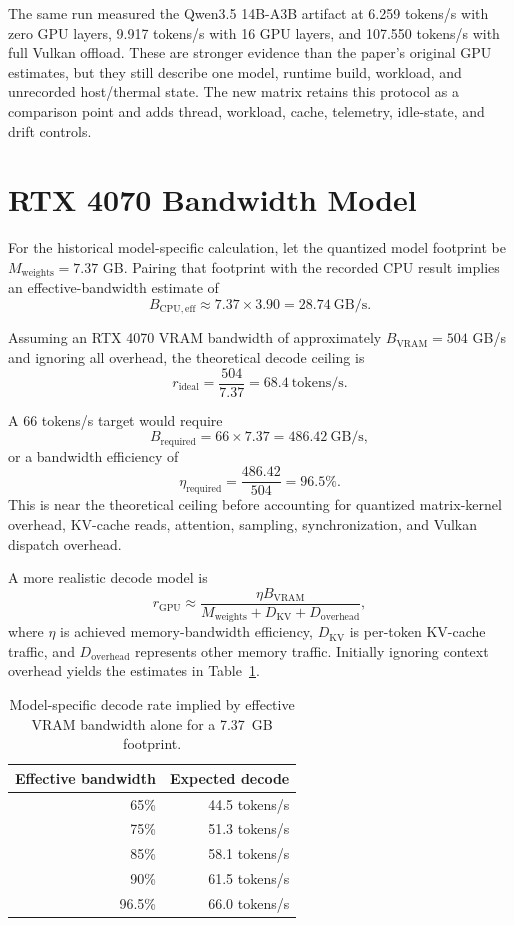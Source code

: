 \documentclass[11pt]{article}
\begin{document}
The same run measured the Qwen3.5 14B-A3B artifact at 6.259 tokens/s with zero GPU layers, 9.917 tokens/s with 16 GPU layers, and 107.550 tokens/s with full Vulkan offload. These are stronger evidence than the paper's original GPU estimates, but they still describe one model, runtime build, workload, and unrecorded host/thermal state. The new matrix retains this protocol as a comparison point and adds thread, workload, cache, telemetry, idle-state, and drift controls.

\section{RTX 4070 Bandwidth Model}

For the historical model-specific calculation, let the quantized model footprint be $M_{\mathrm{weights}} = 7.37$ GB. Pairing that footprint with the recorded CPU result implies an effective-bandwidth estimate of
\[
B_{\mathrm{CPU,eff}} \approx 7.37 \times 3.90 = 28.74\ \text{GB/s}.
\]

Assuming an RTX 4070 VRAM bandwidth of approximately $B_{\mathrm{VRAM}}=504$ GB/s and ignoring all overhead, the theoretical decode ceiling is
\[
r_{\mathrm{ideal}} = \frac{504}{7.37} = 68.4\ \text{tokens/s}.
\]

A 66 tokens/s target would require
\[
B_{\mathrm{required}} = 66 \times 7.37 = 486.42\ \text{GB/s},
\]
or a bandwidth efficiency of
\[
\eta_{\mathrm{required}} = \frac{486.42}{504} = 96.5\%.
\]
This is near the theoretical ceiling before accounting for quantized matrix-kernel overhead, KV-cache reads, attention, sampling, synchronization, and Vulkan dispatch overhead.

A more realistic decode model is
\[
r_{\mathrm{GPU}} \approx
\frac{\eta B_{\mathrm{VRAM}}}
{M_{\mathrm{weights}} + D_{\mathrm{KV}} + D_{\mathrm{overhead}}},
\]
where $\eta$ is achieved memory-bandwidth efficiency, $D_{\mathrm{KV}}$ is per-token KV-cache traffic, and $D_{\mathrm{overhead}}$ represents other memory traffic. Initially ignoring context overhead yields the estimates in Table~\ref{tab:gpu-efficiency}.

\begin{table}[h]
\centering
\caption{Model-specific decode rate implied by effective VRAM bandwidth alone for a 7.37~GB footprint.}
\label{tab:gpu-efficiency}
\begin{tabular}{rr}
\toprule
Effective bandwidth & Expected decode \\
\midrule
65\% & 44.5 tokens/s \\
75\% & 51.3 tokens/s \\
85\% & 58.1 tokens/s \\
90\% & 61.5 tokens/s \\
96.5\% & 66.0 tokens/s \\
\bottomrule
\end{tabular}
\end{table}
\end{document}
